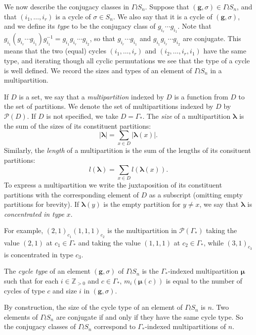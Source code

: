 \documentclass[ALCO,Unicode]{cedram}
\newcommand{\bs}{\boldsymbol}
\begin{document}
We now describe the conjugacy classes in $\Gamma \wr S_n$. Suppose that $(\mathbf{g}, \sigma) \in \Gamma \wr S_n$, and that $(i_1, \ldots, i_r)$ is a cycle of $\sigma \in S_n$. We also say that it is a cycle of $(\mathbf{g}, \sigma)$, and we define its \emph{type} to be the conjugacy class of $g_{i_r} \cdots g_{i_1}$. Note that $g_{i_1}(g_{i_r} \cdots g_{i_1})g_{i_1}^{-1} = g_{i_1} g_{i_r}\cdots g_{i_2}$, so that $g_{i_r} \cdots g_{i_1}$ and $g_{i_1} g_{i_r} \cdots g_{i_2}$ are conjugate. This means that the two (equal) cycles $(i_1, \ldots, i_r)$ and $(i_2, \ldots, i_r, i_1)$ have the same type, and iterating though all cyclic permutations we see that the type of a cycle is well defined. We record the sizes and types of an element of $\Gamma \wr S_n$ in a multipartition.
\begin{definition}
If $D$ is a set, we say that a \emph{multipartition} indexed by $D$ is a function from $D$ to the set of partitions. We denote the set of multipartitions indexed by $D$ by $\mathcal{P}(D)$. If $D$ is not specified, we take $D = \Gamma_*$. The \emph{size} of a multipartition $\bs \lambda$ is the sum of the sizes of its constituent partitions:
\[
|\bs \lambda| = \sum_{x \in D} |\bs\lambda(x)|.
\]
Similarly, the \emph{length} of a multipartition is the sum of the lengths of its consituent partitions:
\[
l(\bs \lambda) = \sum_{x \in D} l(\bs\lambda(x)).
\]
To express a multipartition we write the juxtaposition of its constituent partitions with the corresponding element of $D$ as a subscript \textup{(}omitting empty partitions for brevity\textup{)}. If $\bs\lambda(y)$ is the empty partition for $y \neq x$, we say that $\bs\lambda$ is \emph{concentrated in type $x$}.
\end{definition}

For example, $(2,1)_{c_1} (1,1,1)_{c_2}$ is the multipartition in $\mathcal{P}(\Gamma_*)$ taking the value $(2,1)$ at $c_1 \in \Gamma_*$ and taking the value $(1,1,1)$ at $c_2 \in \Gamma_*$, while $(3,1)_{c_3}$ is concentrated in type $c_3$.
\begin{definition}
The \emph{cycle type} of an element $(\mathbf{g}, \sigma)$ of $\Gamma \wr S_n$ is the $\Gamma_*$-indexed multipartition $\bs \mu$ such that for each $i \in \mathbb{Z}_{>0}$ and $c \in \Gamma_*$, $m_i(\bs\mu(c))$ is equal to the number of cycles of type $c$ and size $i$ in $(\mathbf{g}, \sigma)$.
\end{definition}

By construction, the size of the cycle type of an element of $\Gamma \wr S_n$ is $n$. Two elements of $\Gamma \wr S_n$ are conjugate if and only if they have the same cycle type. So the conjugacy classes of $\Gamma \wr S_n$ correspond to $\Gamma_*$-indexed multipartitions of $n$.
\end{document}
